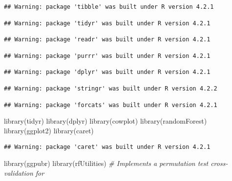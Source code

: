 \documentclass[
]{article}
\newenvironment{Shaded}{\begin{snugshade}}{\end{snugshade}}
\newcommand{\CommentTok}[1]{\textcolor[rgb]{0.56,0.35,0.01}{\textit{#1}}}
\newcommand{\FunctionTok}[1]{\textcolor[rgb]{0.00,0.00,0.00}{#1}}
\newcommand{\NormalTok}[1]{#1}
\begin{document}
\begin{verbatim}
## Warning: package 'tibble' was built under R version 4.2.1
\end{verbatim}

\begin{verbatim}
## Warning: package 'tidyr' was built under R version 4.2.1
\end{verbatim}

\begin{verbatim}
## Warning: package 'readr' was built under R version 4.2.1
\end{verbatim}

\begin{verbatim}
## Warning: package 'purrr' was built under R version 4.2.1
\end{verbatim}

\begin{verbatim}
## Warning: package 'dplyr' was built under R version 4.2.1
\end{verbatim}

\begin{verbatim}
## Warning: package 'stringr' was built under R version 4.2.2
\end{verbatim}

\begin{verbatim}
## Warning: package 'forcats' was built under R version 4.2.1
\end{verbatim}

\begin{Shaded}
\begin{Highlighting}[]
\FunctionTok{library}\NormalTok{(tidyr)}
\FunctionTok{library}\NormalTok{(dplyr)}
\FunctionTok{library}\NormalTok{(cowplot)}
\FunctionTok{library}\NormalTok{(randomForest)}
\FunctionTok{library}\NormalTok{(ggplot2)}
\FunctionTok{library}\NormalTok{(caret)}
\end{Highlighting}
\end{Shaded}

\begin{verbatim}
## Warning: package 'caret' was built under R version 4.2.1
\end{verbatim}

\begin{Shaded}
\begin{Highlighting}[]
\FunctionTok{library}\NormalTok{(ggpubr)}
\FunctionTok{library}\NormalTok{(rfUtilities) }\CommentTok{\# Implements a permutation test cross{-}validation for }
\end{Highlighting}
\end{Shaded}
\end{document}
